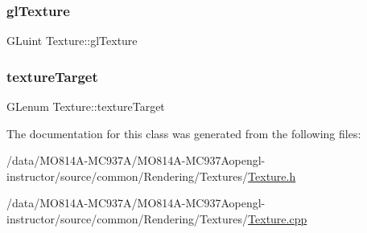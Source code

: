 \subsubsection{\texorpdfstring{gl\+Texture}{glTexture}}
{\footnotesize\ttfamily G\+Luint Texture\+::gl\+Texture\hspace{0.3cm}{\ttfamily [protected]}}

\hypertarget{class_texture_a743402dc306a143404ee2d246d864fb7}{}\label{class_texture_a743402dc306a143404ee2d246d864fb7}
\subsubsection{\texorpdfstring{texture\+Target}{textureTarget}}
{\footnotesize\ttfamily G\+Lenum Texture\+::texture\+Target\hspace{0.3cm}{\ttfamily [protected]}}



The documentation for this class was generated from the following files\+:\begin{DoxyCompactItemize}
\item
/data/MO814A-MC937A/MO814A-MC937Aopengl-\/instructor/source/common/\+Rendering/\+Textures/\hyperlink{_texture_8h}{Texture.\+h}\item
/data/MO814A-MC937A/MO814A-MC937Aopengl-\/instructor/source/common/\+Rendering/\+Textures/\hyperlink{_texture_8cpp}{Texture.\+cpp}\end{DoxyCompactItemize}
